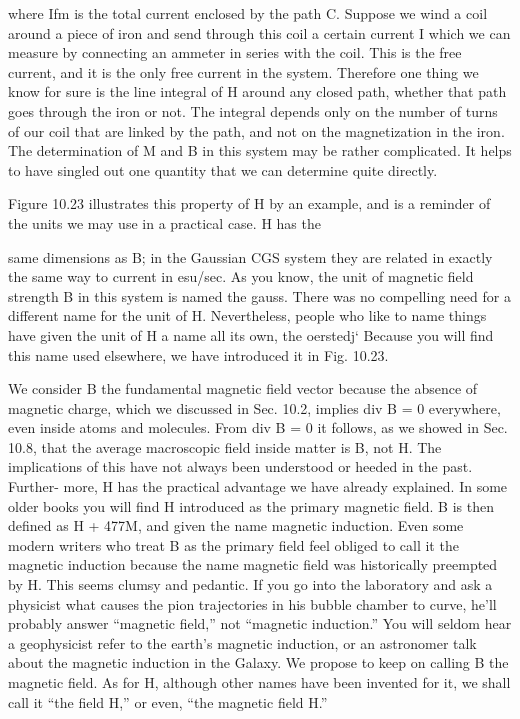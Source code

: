 {where Ifm is the total current enclosed by the path C. Suppose we
wind a coil around a piece of iron and send through this coil a certain
current I which we can measure by connecting an ammeter in
series with the coil. This is the free current, and it is the only free
current in the system. Therefore one thing we know for sure is the
line integral of H around any closed path, whether that path goes
through the iron or not. The integral depends only on the number
of turns of our coil that are linked by the path, and not on the magnetization
in the iron. The determination of M and B in this system
may be rather complicated. It helps to have singled out one quantity
that we can determine quite directly.

Figure 10.23 illustrates this property of H by an example, and is
a reminder of the units we may use in a practical case. H has the

same dimensions as B; in the Gaussian CGS system they are related
in exactly the same way to current in esu/sec. As you know, the
unit of magnetic field strength B in this system is named the gauss.
There was no compelling need for a different name for the unit of H.
Nevertheless, people who like to name things have given the unit
of H a name all its own, the oerstedj‘ Because you will find this
name used elsewhere, we have introduced it in Fig. 10.23.

We consider B the fundamental magnetic field vector because the
absence of magnetic charge, which we discussed in Sec. 10.2, implies
div B = 0 everywhere, even inside atoms and molecules. From
div B = 0 it follows, as we showed in Sec. 10.8, that the average
macroscopic field inside matter is B, not H. The implications of
this have not always been understood or heeded in the past. Further-
more, H has the practical advantage we have already explained. In
some older books you will find H introduced as the primary magnetic
field. B is then defined as H + 477M, and given the name magnetic
induction. Even some modern writers who treat B as the primary
field feel obliged to call it the magnetic induction because the name
magnetic field was historically preempted by H. This seems clumsy
and pedantic. If you go into the laboratory and ask a physicist what
causes the pion trajectories in his bubble chamber to curve, he'll
probably answer ``magnetic field,'' not ``magnetic induction.'' You
will seldom hear a geophysicist refer to the earth's magnetic 
induction, or an astronomer talk about the magnetic induction in the
Galaxy. We propose to keep on calling B the magnetic field. As
for H, although other names have been invented for it, we shall call
it ``the field H,'' or even, ``the magnetic field H.''

}

